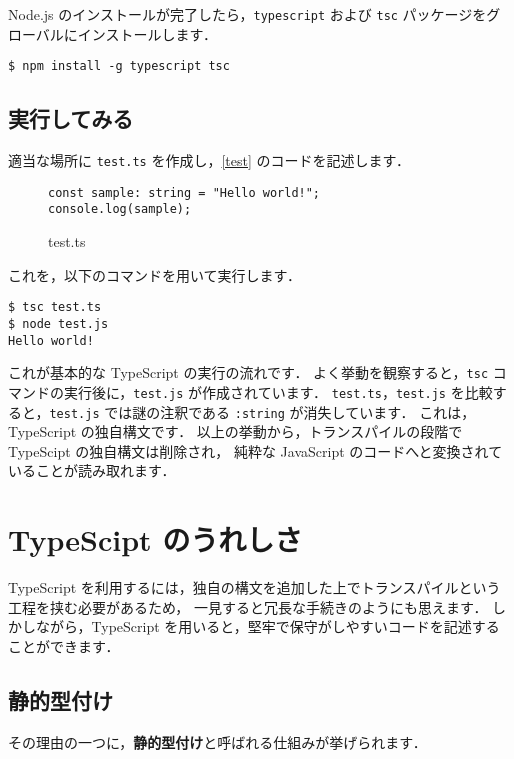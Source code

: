 \documentclass[a4j, 11pt]{jarticle}
\begin{document}
Node.js のインストールが完了したら，\verb|typescript| および \verb|tsc| パッケージをグローバルにインストールします．

\begin{verbatim}
$ npm install -g typescript tsc
\end{verbatim}

\subsection{実行してみる}

適当な場所に \verb|test.ts| を作成し，\autoref{test} のコードを記述します．

\begin{figure}[H]
\caption{test.ts}
\label{test}
\begin{lstlisting}
const sample: string = "Hello world!";
console.log(sample);
\end{lstlisting}
\end{figure}

これを，以下のコマンドを用いて実行します．

\begin{verbatim}
$ tsc test.ts
$ node test.js
Hello world!
\end{verbatim}

これが基本的な TypeScript の実行の流れです．
よく挙動を観察すると，\verb|tsc| コマンドの実行後に，\verb|test.js| が作成されています．
\verb|test.ts|，\verb|test.js| を比較すると，\verb|test.js| では謎の注釈である \verb|:string| が消失しています．
これは，TypeScript の独自構文です．
以上の挙動から，トランスパイルの段階で TypeScipt の独自構文は削除され，
純粋な JavaScript のコードへと変換されていることが読み取れます．

\section{TypeScipt のうれしさ}

TypeScript を利用するには，独自の構文を追加した上でトランスパイルという工程を挟む必要があるため，
一見すると冗長な手続きのようにも思えます．
しかしながら，TypeScript を用いると，堅牢で保守がしやすいコードを記述することができます．

\subsection{静的型付け}

その理由の一つに，\textbf{静的型付け}と呼ばれる仕組みが挙げられます．
\end{document}
